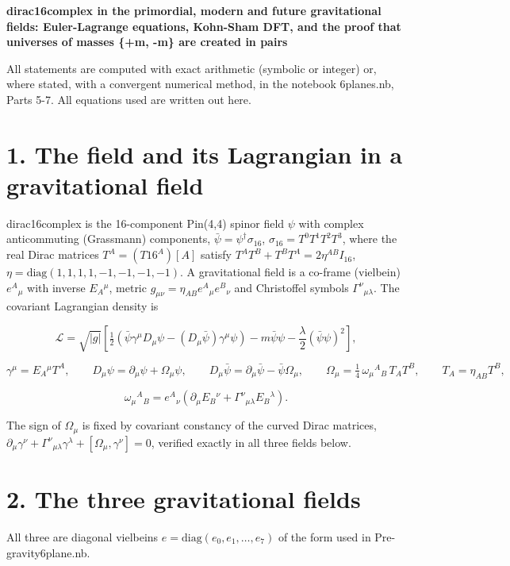 \documentclass[10pt]{article}
\makeatletter
\newcommand\keepnext{\par\nopagebreak\@nobreaktrue\everypar{\@nobreakfalse\everypar{}}}
\makeatother
\begin{document}
{\raggedright\LARGE\bfseries dirac16complex in the primordial, modern and future gravitational fields: Euler-Lagrange equations, Kohn-Sham DFT, and the proof that universes of masses \{+m, -m\} are created in pairs\par}\medskip

All statements are computed with exact arithmetic (symbolic or integer) or, where stated, with a convergent numerical method, in the notebook 6planes.nb, Parts 5-7. All equations used are written out here.


\section*{1. The field and its Lagrangian in a gravitational field}

dirac16complex is the 16-component Pin(4,4) spinor field $\psi$ with complex anticommuting (Grassmann) components, $\bar\psi = \psi^\dagger\sigma_{16}$, $\sigma_{16} = T^0T^1T^2T^3$, where the real Dirac matrices $T^A = (T16^A)[A]$ satisfy $T^AT^B + T^BT^A = 2\eta^{AB}I_{16}$, $\eta = \mathrm{diag}(1,1,1,1,-1,-1,-1,-1)$. A gravitational field is a co-frame (vielbein) $e^A{}_\mu$ with inverse $E_A{}^\mu$, metric $g_{\mu\nu} = \eta_{AB}e^A{}_\mu e^B{}_\nu$ and Christoffel symbols $\Gamma^\nu{}_{\mu\lambda}$. The covariant Lagrangian density is\keepnext


\[
\mathcal L = \sqrt{\lvert g\rvert}\left[\tfrac12\left(\bar\psi\gamma^\mu D_\mu\psi - (D_\mu\bar\psi)\gamma^\mu\psi\right) - m\bar\psi\psi - \frac\lambda2(\bar\psi\psi)^2\right],
\]

\[
\gamma^\mu = E_A{}^\mu T^A,\qquad D_\mu\psi = \partial_\mu\psi + \Omega_\mu\psi,\qquad D_\mu\bar\psi = \partial_\mu\bar\psi - \bar\psi\Omega_\mu,\qquad \Omega_\mu = \tfrac14\,\omega_\mu{}^A{}_B\,T_AT^B,\qquad T_A = \eta_{AB}T^B,
\]

\[
\omega_\mu{}^A{}_B = e^A{}_\nu\left(\partial_\mu E_B{}^\nu + \Gamma^\nu{}_{\mu\lambda}E_B{}^\lambda\right).
\]

The sign of $\Omega_\mu$ is fixed by covariant constancy of the curved Dirac matrices, $\partial_\mu\gamma^\nu + \Gamma^\nu{}_{\mu\lambda}\gamma^\lambda + [\Omega_\mu, \gamma^\nu] = 0$, verified exactly in all three fields below.


\section*{2. The three gravitational fields}

All three are diagonal vielbeins $e = \mathrm{diag}(e_0, e_1, \dots, e_7)$ of the form used in Pre-gravity6plane.nb.
\end{document}
